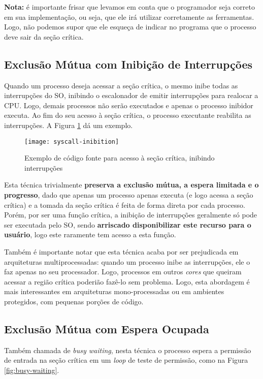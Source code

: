 \textbf{Nota:} é importante frisar que levamos em conta que o programador seja correto em sua implementação, ou seja, que ele irá utilizar corretamente as ferramentas. Logo, não podemos supor que ele esqueça de indicar no programa que o processo deve sair da seção crítica.




\subsection{Exclusão Mútua com Inibição de Interrupções}
Quando um processo deseja acessar a seção crítica, o mesmo inibe todas as interrupções do SO, inibindo o escalonador de emitir interrupções para realocar a CPU. Logo, demais processos não serão executados e apenas o processo inibidor executa. Ao fim do seu acesso à seção crítica, o processo executante reabilita as interrupções. A Figura \ref{fig:syscall-inibition} dá um exemplo.

\begin{figure}[ht]
  \centering
  \texttt{[image: syscall-inibition]}
  \caption{Exemplo de código fonte para acesso à seção crítica, inibindo interrupções}
  \label{fig:syscall-inibition}
\end{figure}

Esta técnica trivialmente \textbf{preserva a exclusão mútua, a espera limitada e o progresso}, dado que apenas um processo apenas executa (e logo acessa a seção crítica) e a tomada da seção crítica é feita de forma direta por cada processo. Porém, por ser uma função crítica, a inibição de interrupções geralmente só pode ser executada pelo SO, sendo \textbf{arriscado disponibilizar este recurso para o usuário}, logo este raramente tem acesso a esta função.

Também é importante notar que esta técnica acaba por ser prejudicada em arquiteturas multiprocessadas: quando um processo inibe as interrupções, ele o faz apenas no seu processador. Logo, processos em outros \textit{cores} que queiram acessar a região crítica poderião fazê-lo sem problema. Logo, esta abordagem é mais interessantes em arquiteturas mono-processadas ou em ambientes protegidos, com pequenas porções de código.





\subsection{Exclusão Mútua com Espera Ocupada}
Também chamada de \textit{busy waiting}, nesta técnica o processo espera a permissão de entrada na seção crítica em um \textit{loop} de teste de permissão, como na Figura \ref{fig:busy-waiting}.

